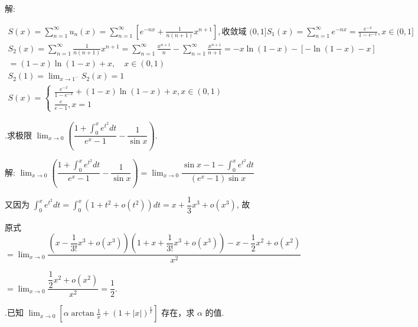 \documentclass{article}
\begin{document}
解:

$\begin{array}{l}
        S(x)=\sum_{n=1}^{\infty} u_{n}(x)=\sum_{n=1}^{\infty}\left[e^{-n x}+\frac{1}{n(n+1)} x^{n+1}\right] ,\text {收敛域 } (0,1]
        S_{1}(x)=\sum_{n=1}^{\infty} e^{-n x}=\frac{e^{-x}}{1-e^{-x}}, x \in(0,1]                                                                                       \\
        S_{2}(x)=\sum_{n=1}^{\infty} \frac{1}{n(n+1)} x^{n+1}=\sum_{n=1}^{\infty} \frac{x^{n+1}}{n}-\sum_{n=1}^{\infty} \frac{x^{n+1}}{n+1}=-x \ln (1-x)-[-\ln (1-x)-x] \\
        =(1-x) \ln (1-x)+x, \quad x \in(0,1)                                                                                                                            \\
        S_{2}(1)=\lim _{x \rightarrow 1^{-}} S_{2}(x)=1                                                                                                                 \\
        S(x)=\left\{\begin{array}{l}
            \frac{e^{-x}}{1-e^{-x}}+(1-x) \ln (1-x)+x, x \in(0,1) \\
            \frac{e}{e-1}, x=1
        \end{array}\right.
    \end{array}$

\vspace{1ex}
{.}求极限 $\lim _{x \rightarrow 0}\left(\dfrac{1+\int_{0}^{x} e^{t^{2}} d t}{e^{x}-1}-\dfrac{1}{\sin x}\right) .$

解: $\lim _{x \rightarrow 0}\left(\dfrac{1+\int_{0}^{x} e^{t^{2}} d t}{e^{x}-1}-\dfrac{1}{\sin x}\right)=\lim _{x \rightarrow 0} \dfrac{\sin x-1-\int_{0}^{x} e^{t^{2}} d t}{\left(e^{x}-1\right) \sin x}$

又因为 $\int_{0}^{x} e^{t^{2}} d t=\int_{0}^{x}\left(1+t^{2}+o\left(t^{2}\right)\right) d t=x+\dfrac{1}{3} x^{3}+o\left(x^{3}\right)$, 故

原式 $=\lim _{x \rightarrow 0} \dfrac{\left(x-\dfrac{1}{3 !} x^{3}+o\left(x^{3}\right)\right)\left(1+x+\dfrac{1}{3 !} x^{3}+o\left(x^{3}\right)\right)-x-\dfrac{1}{2} x^{2}+o\left(x^{2}\right)}{x^{2}}$

$=\lim _{x \rightarrow 0} \dfrac{\dfrac{1}{2} x^{2}+o\left(x^{2}\right)}{x^{2}}=\dfrac{1}{2} .$

\vspace{1ex}
{.}已知 $\lim _{x \rightarrow 0}\left[\alpha \arctan \frac{1}{x}+(1+|x|)^{\frac{1}{x}}\right]$ 存在，求 $\alpha$ 的值.
\end{document}
